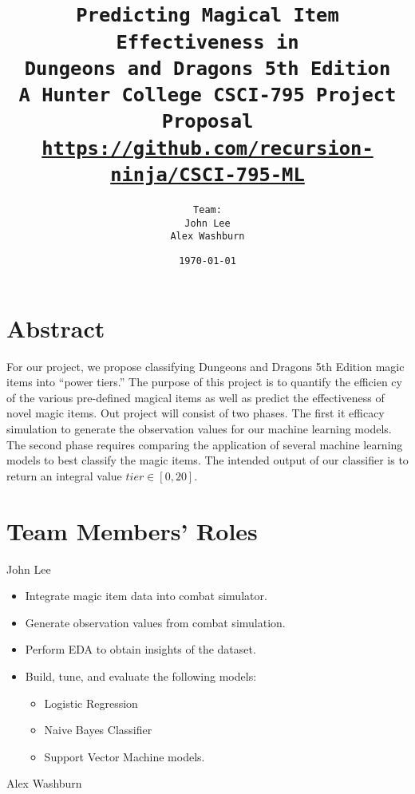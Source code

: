 \documentclass[12pt]{diazessay}
\title{\texttt{\LARGE{Predicting Magical Item Effectiveness in \\Dungeons and Dragons 5th Edition} \\\vspace{-0.35cm} {\large A Hunter College CSCI-795 Project Proposal}\\\normalsize\url{https://github.com/recursion-ninja/CSCI-795-ML}}} %
\author{\texttt{{\Huge Team:}\\\vspace*{-0.5em} 
		John Lee \\\vspace*{-0.5em} 
		Alex Washburn}} %
\date{\texttt{\today}} %
\begin{document}
\maketitle %

\vspace{-1cm}
\section*{Abstract}


For our project, we propose classifying Dungeons and Dragons 5th Edition magic items into ``power tiers.''
The purpose of this project is to quantify the efficien
cy of the various pre-defined magical items as well as predict the effectiveness of novel magic items.
Out project will consist of two phases. The first it efficacy simulation to generate the observation values for our machine learning models.
The second phase requires comparing the application of several machine learning models to best classify the magic items.
The intended output of our classifier is to return an integral value $tier \in [0, 20]$.

\section*{Team Members' Roles}

John Lee

\begin{itemize}
	
	\item Integrate magic item data into combat simulator.
	\item Generate observation values from combat simulation.
	\item Perform EDA to obtain insights of the dataset.
	\item Build, tune, and evaluate the following models:
	\begin{itemize}
		\item Logistic Regression
		\item Naive Bayes Classifier
		\item Support Vector Machine models.
	\end{itemize}
	
\end{itemize}

Alex Washburn
\end{document}
